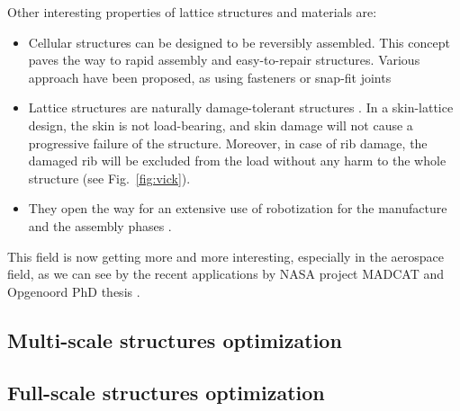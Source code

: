 Other interesting properties of lattice structures and materials are:
\begin{itemize}
    \item Cellular structures can be designed to be reversibly assembled. This concept paves the way to rapid assembly and easy-to-repair structures. Various approach have been proposed, as using fasteners  or snap-fit joints 
    \item     
    
    Lattice structures are naturally damage-tolerant structures . In a skin-lattice design, the skin is not load-bearing, and skin damage will not cause a progressive failure of the structure. Moreover, in case of rib damage, the damaged rib will be excluded from the load without any harm to the whole structure (see Fig.~\ref{fig:vick}).
    \item They open the way for an extensive use of robotization for the manufacture  and the assembly phases .
\end{itemize}

This field is now getting more and more interesting, especially in the aerospace field, as we can see by the recent applications by NASA project MADCAT  and Opgenoord PhD thesis .

\subsection{Multi-scale structures optimization}

\subsection{Full-scale structures optimization}

